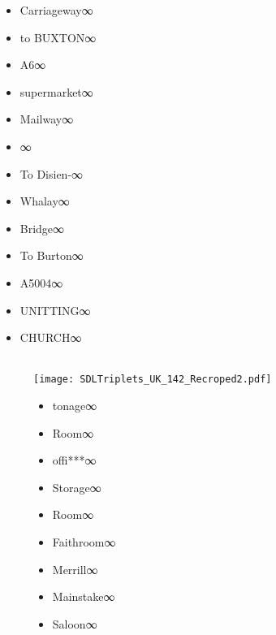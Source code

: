 \documentclass[conference]{IEEEtran}
\begin{document}
\begin{figure*}[th!]
{\begin{minipage}[b]{8cm}
\begin{small}
\begin{itemize}
      \item Carriageway∞
      \item to BUXTON∞
      \item A6∞
      \item supermarket∞
      \item Mailway∞
      \item ∞
      \item To Disien-∞
      \item Whalay∞
      \item Bridge∞
      \item To Burton∞
      \item A5004∞
      \item UNITTING∞
      \item CHURCH∞
    \end{itemize}
    \end{small}
  \end{minipage}
  }
\end{figure*}

\clearpage

\begin{figure}[th!]
  \\
  \texttt{[image: SDLTriplets\_UK\_142\_Recroped2.pdf]}
  \\
   \label{fig:imgIlus1}
    \begin{small}
    \begin{itemize}
       \item tonage∞
       \item Room∞
       \item offi***∞
       \item Storage∞
       \item Room∞
       \item Faithroom∞
       \item Merrill∞
       \item Mainstake∞
       \item Saloon∞
    \end{itemize}
    \end{small}
\end{figure}



\end{document}
